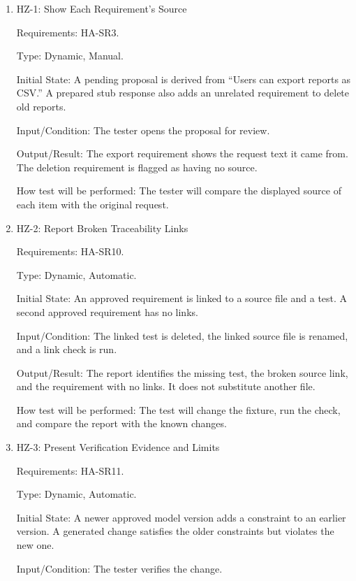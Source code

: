\documentclass[12pt, titlepage]{article}
\begin{document}
\begin{enumerate}

\item{HZ-1: Show Each Requirement's Source\\}

Requirements: HA-SR3.

Type: Dynamic, Manual.

Initial State: A pending proposal is derived from ``Users can export reports as CSV.''
A prepared stub response also adds an unrelated requirement to delete old reports.

Input/Condition: The tester opens the proposal for review.

Output/Result: The export requirement shows the request text it came from. The deletion
requirement is flagged as having no source.

How test will be performed: The tester will compare the displayed source of each item
with the original request.

\item{HZ-2: Report Broken Traceability Links\\}

Requirements: HA-SR10.

Type: Dynamic, Automatic.

Initial State: An approved requirement is linked to a source file and a test. A second
approved requirement has no links.

Input/Condition: The linked test is deleted, the linked source file is renamed, and a
link check is run.

Output/Result: The report identifies the missing test, the broken source link, and the
requirement with no links. It does not substitute another file.

How test will be performed: The test will change the fixture, run the check, and compare
the report with the known changes.

\item{HZ-3: Present Verification Evidence and Limits\\}

Requirements: HA-SR11.

Type: Dynamic, Automatic.

Initial State: A newer approved model version adds a constraint to an earlier version. A
generated change satisfies the older constraints but violates the new one.

Input/Condition: The tester verifies the change.


\end{enumerate}
\end{document}
